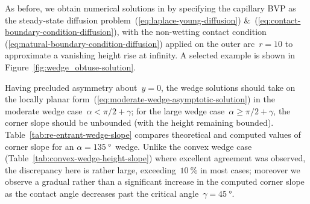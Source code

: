 As before, we obtain numerical solutions in 
by specifying the capillary BVP
as the steady-state diffusion problem~(\ref{eq:laplace-young-diffusion})
\&~(\ref{eq:contact-boundary-condition-diffusion}),
with the non-wetting contact condition~%
  (\ref{eq:natural-boundary-condition-diffusion})
applied on the outer arc~$r = 10$
to approximate a vanishing height rise at infinity.
A selected example is shown
in Figure~\ref{fig:wedge_obtuse-solution}.

\begin{figure}
\end{figure}

Having precluded asymmetry about~$y = 0$,
the wedge solutions should take on
the locally planar form~(\ref{eq:moderate-wedge-asymptotic-solution})
in the moderate wedge case~$\alpha < \pi/2 + \gamma$;
for the large wedge case~$\alpha \ge \pi/2 + \gamma$,
the corner slope should be unbounded
(with the height remaining bounded).
Table~\ref{tab:re-entrant-wedge-slope}
compares theoretical and computed values of corner slope
for an $\alpha = \SI{135}{\degree}$~wedge.
Unlike the convex wedge case (Table~\ref{tab:convex-wedge-height-slope})
where excellent agreement was observed,
the discrepancy here is rather large,
exceeding~$\SI{10}{\percent}$ in most cases;
moreover we observe a gradual rather than a significant increase
in the computed corner slope
as the contact angle decreases past
the critical angle~$\gamma = \SI{45}{\degree}$.

